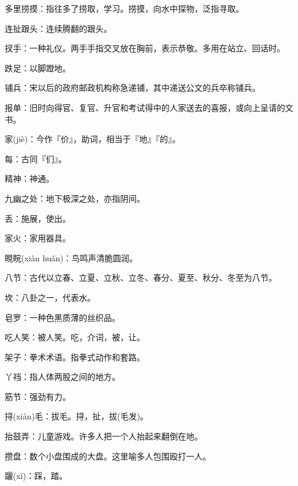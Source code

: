 \startbuffer[107]
多里捞摸：指往多了捞取，学习。捞摸，向水中探物，泛指寻取。
\stopbuffer


\startbuffer[108]
连扯跟头：连续腾翻的跟头。
\stopbuffer


\startbuffer[109]
扠手：一种礼仪。两手手指交叉放在胸前，表示恭敬。多用在站立、回话时。
\stopbuffer


\startbuffer[110]
跌足：以脚蹬地。
\stopbuffer


\startbuffer[111]
铺兵：宋以后的政府邮政机构称急递铺，其中递送公文的兵卒称铺兵。
\stopbuffer


\startbuffer[112]
报单：旧时向得官、复官、升官和考试得中的人家送去的喜报，或向上呈请的文书。
\stopbuffer


\startbuffer[113]
家(jiè)：今作『价』，助词，相当于『地』『的』。
\stopbuffer


\startbuffer[114]
每：古同『们』。
\stopbuffer


\startbuffer[115]
精神：神通。
\stopbuffer


\startbuffer[116]
九幽之处：地下极深之处，亦指阴间。
\stopbuffer


\startbuffer[117]
丢：施展，使出。
\stopbuffer


\startbuffer[118]
家火：家用器具。
\stopbuffer


\startbuffer[119]
睍睆(xiàn huǎn)：鸟鸣声清脆圆润。
\stopbuffer


\startbuffer[120]
八节：古代以立春、立夏、立秋、立冬、春分、夏至、秋分、冬至为八节。
\stopbuffer


\startbuffer[121]
坎：八卦之一，代表水。
\stopbuffer


\startbuffer[122]
皂罗：一种色黑质薄的丝织品。
\stopbuffer


\startbuffer[123]
吃人笑：被人笑。吃，介词，被，让。
\stopbuffer


\startbuffer[124]
架子：拳术术语。指拳式动作和套路。
\stopbuffer


\startbuffer[125]
丫裆：指人体两股之间的地方。
\stopbuffer


\startbuffer[126]
筋节：强劲有力。
\stopbuffer


\startbuffer[127]
挦(xián)毛：拔毛。挦，扯，拔(毛发)。
\stopbuffer


\startbuffer[128]
抬鼓弄：儿童游戏。许多人把一个人抬起来翻倒在地。
\stopbuffer


\startbuffer[129]
攒盘：数个小盘围成的大盘。这里喻多人包围殴打一人。
\stopbuffer


\startbuffer[130]
躧(xǐ)：踩，踏。
\stopbuffer


